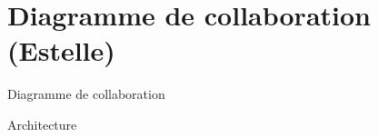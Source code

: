 \documentclass[xetex]{beamer}
\begin{document}
    
    \section{Diagramme de collaboration (Estelle)}
    \begin{frame}{Diagramme de collaboration}
\noindent{}
    \end{frame}
    
    \begin{frame}{Architecture}
\noindent{}
    \end{frame}
    
\end{document}
